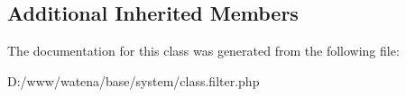 \subsection*{Additional Inherited Members}


The documentation for this class was generated from the following file\-:\begin{DoxyCompactItemize}
\item 
D\-:/www/watena/base/system/class.\-filter.\-php\end{DoxyCompactItemize}
